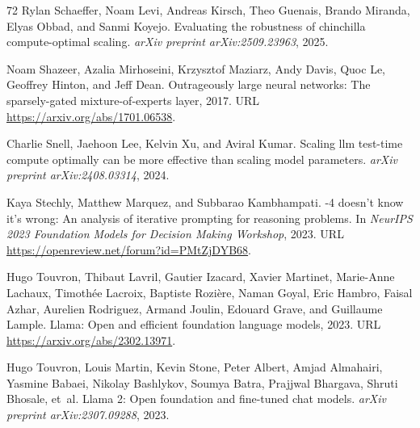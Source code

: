 \begin{thebibliography}{72}
Rylan Schaeffer, Noam Levi, Andreas Kirsch, Theo Guenais, Brando Miranda, Elyas Obbad, and Sanmi Koyejo.
\newblock Evaluating the robustness of chinchilla compute-optimal scaling.
\newblock \emph{arXiv preprint arXiv:2509.23963}, 2025.

Noam Shazeer, Azalia Mirhoseini, Krzysztof Maziarz, Andy Davis, Quoc Le, Geoffrey Hinton, and Jeff Dean.
\newblock Outrageously large neural networks: The sparsely-gated mixture-of-experts layer, 2017.
\newblock URL \url{https://arxiv.org/abs/1701.06538}.

Charlie Snell, Jaehoon Lee, Kelvin Xu, and Aviral Kumar.
\newblock Scaling llm test-time compute optimally can be more effective than scaling model parameters.
\newblock \emph{arXiv preprint arXiv:2408.03314}, 2024.

Kaya Stechly, Matthew Marquez, and Subbarao Kambhampati.
-4 doesn{\textquoteright}t know it{\textquoteright}s wrong: An analysis of iterative prompting for reasoning problems.
\newblock In \emph{NeurIPS 2023 Foundation Models for Decision Making Workshop}, 2023.
\newblock URL \url{https://openreview.net/forum?id=PMtZjDYB68}.

Hugo Touvron, Thibaut Lavril, Gautier Izacard, Xavier Martinet, Marie-Anne Lachaux, Timothée Lacroix, Baptiste Rozière, Naman Goyal, Eric Hambro, Faisal Azhar, Aurelien Rodriguez, Armand Joulin, Edouard Grave, and Guillaume Lample.
\newblock Llama: Open and efficient foundation language models, 2023{}.
\newblock URL \url{https://arxiv.org/abs/2302.13971}.

Hugo Touvron, Louis Martin, Kevin Stone, Peter Albert, Amjad Almahairi, Yasmine Babaei, Nikolay Bashlykov, Soumya Batra, Prajjwal Bhargava, Shruti Bhosale, et~al.
\newblock Llama 2: Open foundation and fine-tuned chat models.
\newblock \emph{arXiv preprint arXiv:2307.09288}, 2023{}.


\end{thebibliography}
